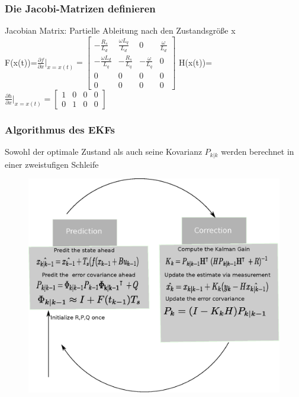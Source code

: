 \documentclass[serif,11pt, xcolor=table]{beamer}
\begin{document}
\begin{frame}
	\frametitle{Die Jacobi-Matrizen definieren}
	 
	Jacobian Matrix: Partielle Ableitung nach den Zustandsgrö{\ss}e x\\
    \vskip 0.2cm
	F(x(t))=$\frac{\partial f}{\partial x}\bigg|_{x = x(t)}  =\begin{bmatrix}
		-\frac{R_{s}}{L_{d}} & \frac{\omega L_{q}}{L_{d}}& 0 &\frac{\omega }{L_{d}} \\
		-\frac{\omega L_{d}}{L_{q}} & -\frac{R_{s}}{L_{q}} &-\frac{\omega} {L_{q}} & 0 \\
		0 & 0 & 0 &0\\
		0 & 0 & 0 &0
	\end{bmatrix}$
	\vskip 0.2cm
	H(x(t))=$\frac{\partial h}{\partial x}\bigg|_{x = x(t)}  =\begin{bmatrix}
		
		1 & 0 & 0 &0\\
		0 & 1 & 0 &0
	\end{bmatrix}$
\end{frame}
\begin{frame}
	\frametitle{Algorithmus des EKFs}
	
	\small{Sowohl der optimale Zustand als auch seine Kovarianz $P_{k|k}$ werden berechnet
		in einer zweistufigen Schleife}
	\begin{figure}[htbp]
		\centering
		\includegraphics[scale=0.33]{Abbildungen/EKF.eps}
		
	\end{figure}	
	
	
\end{frame}
\end{document}
